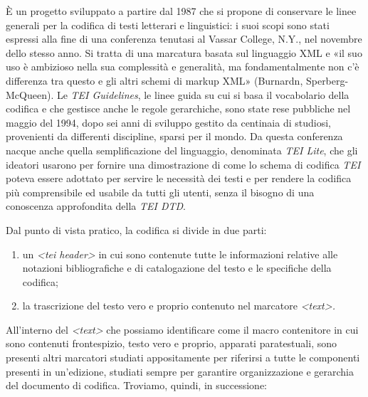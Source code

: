 \documentclass[
  b5paper,
  twoside,
  11pt,
  chapterprefix=false,
  bibliography=totocnumbered,
  parskip=0]{scrbook}
\begin{document}
È un progetto sviluppato a partire dal 1987 che si propone di conservare
le linee generali per la codifica di testi letterari e linguistici: i
suoi scopi sono stati espressi alla fine di una conferenza tenutasi al
Vassar College, N.Y., nel novembre dello stesso anno. Si tratta di una
marcatura basata sul linguaggio XML e «il suo uso è ambizioso nella sua
complessità e generalità, ma fondamentalmente non c'è differenza tra
questo e gli altri schemi di markup XML» (Burnardn, Sperberg-McQueen).
Le \emph{TEI Guidelines}, le linee guida su cui si basa il vocabolario della
codifica e che gestisce anche le regole gerarchiche, sono state rese
pubbliche nel maggio del 1994, dopo sei anni di sviluppo gestito da
centinaia di studiosi, provenienti da differenti discipline, sparsi per
il mondo. Da questa conferenza nacque anche quella semplificazione del
linguaggio, denominata \emph{TEI Lite}, che gli ideatori usarono per fornire
una dimostrazione di come lo schema di codifica \emph{TEI} poteva essere
adottato per servire le necessità dei testi e per rendere la codifica
più comprensibile ed usabile da tutti gli utenti, senza il bisogno di
una conoscenza approfondita della \emph{TEI DTD}.

Dal punto di vista pratico, la codifica si divide in due parti:

\begin{enumerate}
\def\labelenumi{\arabic{enumi}.}
\item
  un \emph{\textless tei header\textgreater{}} in cui sono contenute tutte le informazioni
  relative alle notazioni bibliografiche e di catalogazione del testo
  e le specifiche della codifica;
\item
  la trascrizione del testo vero e proprio contenuto nel marcatore
  \emph{\textless text\textgreater.}
\end{enumerate}

All'interno del \emph{\textless text\textgreater{}} che possiamo identificare come il macro
contenitore in cui sono contenuti frontespizio, testo vero e proprio,
apparati paratestuali, sono presenti altri marcatori studiati
appositamente per riferirsi a tutte le componenti presenti in
un'edizione, studiati sempre per garantire organizzazione e gerarchia
del documento di codifica. Troviamo, quindi, in successione:
\end{document}
